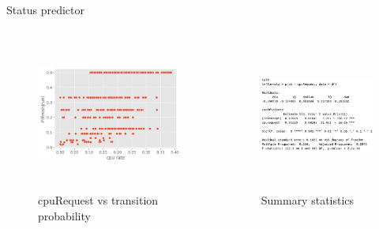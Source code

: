\documentclass[10pt,xcolor={dvipsnames}, aspectratio=169]{beamer}
\begin{document}
\begin{frame}
{Status predictor}
	\begin{columns}[T]
	
		\begin{column}{0.5\textwidth}
			\begin{figure}
				\centering
				\includegraphics[scale=0.6, height=5cm]{images/cpu_vs_pro_img.png}
				\caption{cpuRequest vs transition probability}
			\end{figure}
		\end{column}

		\hfill		
		
		\begin{column}{0.48\textwidth}
			\begin{figure}
				\centering
				\includegraphics[height=5cm, width=6cm]{images/cpu_vs_prob.png}
				\caption{Summary statistics}
			\end{figure}		
		\end{column}
	\end{columns}

\end{frame}
\end{document}
